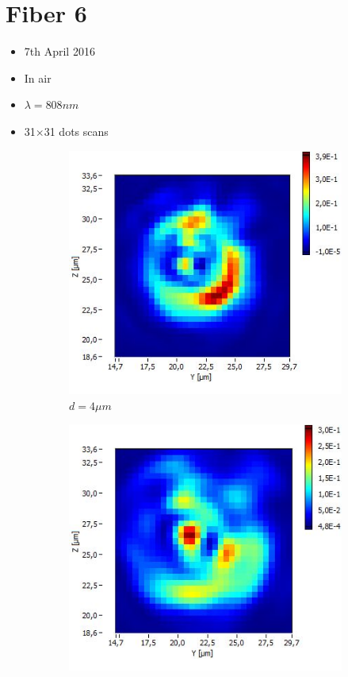 \documentclass[a4paper,11pt]{article}
\begin{document}
\newpage
\section{Fiber 6}
\begin{itemize}
    \item 7th April 2016
    \item In air
    \item $\lambda = 808nm$
    \item 31$\times$31 dots scans
\end{itemize}
\begin{figure}[htb]
  \begin{subfigure}[b]{.19\linewidth}
    \centering
    \includegraphics[width=\textwidth]{Fibre6/scan_006_g1.jpg}
    \caption{$d=4\mu m$}
  \end{subfigure}
  \begin{subfigure}[b]{.19\linewidth}
    \centering
    \includegraphics[width=\textwidth]{Fibre6/scan_007_g1.jpg}

\end{subfigure}
\end{figure}
\end{document}
